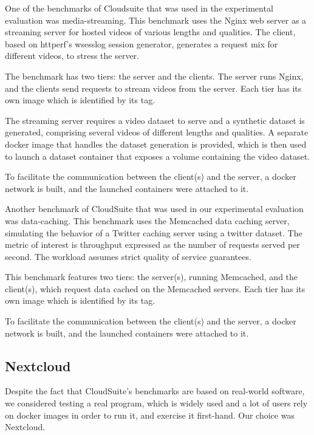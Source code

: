 \begin{description}[style=nextline]
\item[Media Streaming]
One of the benchmarks of Cloudsuite that was used in the experimental evaluation was media-streaming. This benchmark uses the Nginx web server as a streaming server for hosted videos of various lengths and qualities. The client, based on httperf's wsesslog session generator, generates a request mix for different videos, to stress the server. \cite{mediastr}

The benchmark has two tiers: the server and the clients. The server runs Nginx, and the clients send requests to stream videos from the server. Each tier has its own image which is identified by its tag.

The streaming server requires a video dataset to serve and a synthetic dataset is generated, comprising several videos of different lengths and qualities. A separate docker image that handles the dataset generation is provided, which is then used to launch a dataset container that exposes a volume containing the video dataset.

To facilitate the communication between the client(s) and the server, a docker network is built, and the launched containers were attached to it.

\item[Data-Caching]
Another benchmark of CloudSuite that was used in our experimental evaluation was data-caching. This benchmark uses the Memcached data caching server, simulating the behavior of a Twitter caching server using a twitter dataset. The metric of interest is throughput expressed as the number of requests served per second. The workload assumes strict quality of service guarantees. \cite{datacaching}

This benchmark features two tiers: the server(s), running Memcached, and the client(s), which request data cached on the Memcached servers. Each tier has its own image which is identified by its tag.

To facilitate the communication between the client(s) and the server, a docker network is built, and the launched containers were attached to it.
\end{description}

\subsection{Nextcloud}

Despite the fact that CloudSuite's benchmarks are based on real-world software, we considered testing a real program, which is widely used and a lot of users rely on docker images in order to run it, and exercise it first-hand. Our choice was Nextcloud.

